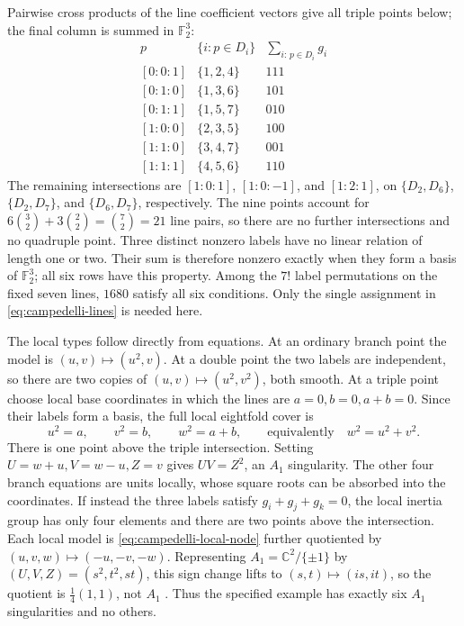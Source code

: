 \documentclass[a4paper,11pt]{article}
\numberwithin{equation}{section}
\theoremstyle{definition}
\begin{document}
Pairwise cross products of the line coefficient vectors give all triple points below; the final column is summed in $\mathbb F_2^3$:
\begin{equation}\label{eq:campedelli-incidences}
\begin{array}{c|c|c}
p&\{i:p\in D_i\}&\sum_{i:\,p\in D_i}g_i\\ \hline
{[0:0:1]}&\{1,2,4\}&111\\
{[0:1:0]}&\{1,3,6\}&101\\
{[0:1:1]}&\{1,5,7\}&010\\
{[1:0:0]}&\{2,3,5\}&100\\
{[1:1:0]}&\{3,4,7\}&001\\
{[1:1:1]}&\{4,5,6\}&110
\end{array}
\end{equation}
The remaining intersections are $[1:0:1]$, $[1:0:-1]$, and $[1:2:1]$,
on $\{D_2,D_6\}$, $\{D_2,D_7\}$, and $\{D_6,D_7\}$, respectively.
The nine points account for $6\binom32+3\binom22=\binom72=21$ line pairs, so there are no further intersections and no quadruple point.
Three distinct nonzero labels have no linear relation of length one or two.
Their sum is therefore nonzero exactly when they form a basis of $\mathbb F_2^3$; all six rows have this property.
Among the $7!$ label permutations on the fixed seven lines, $1680$ satisfy all six conditions.
Only the single assignment in \eqref{eq:campedelli-lines} is needed here.

The local types follow directly from equations. At an ordinary branch point the model is
$(u,v)\mapsto(u^2,v)$. At a double point the two labels are independent, so there are two copies of
$(u,v)\mapsto(u^2,v^2)$, both smooth.
At a triple point choose local base coordinates in which the lines are $a=0,b=0,a+b=0$.
Since their labels form a basis, the full local eightfold cover is
\begin{equation}\label{eq:campedelli-local-node}
u^2=a,\qquad v^2=b,\qquad w^2=a+b,
\qquad\text{equivalently}\quad w^2=u^2+v^2.
\end{equation}
There is one point above the triple intersection. Setting $U=w+u,V=w-u,Z=v$ gives $UV=Z^2$, an $A_1$ singularity.
The other four branch equations are units locally, whose square roots can be absorbed into the coordinates.
If instead the three labels satisfy $g_i+g_j+g_k=0$, the local inertia group has only four elements
and there are two points above the intersection. Each local model is \eqref{eq:campedelli-local-node}
further quotiented by $(u,v,w)\mapsto(-u,-v,-w)$.
Representing $A_1=\mathbb C^2/\{\pm1\}$ by $(U,V,Z)=(s^2,t^2,st)$,
this sign change lifts to $(s,t)\mapsto(is,it)$, so the quotient is $\frac14(1,1)$, not $A_1$
\cite[Table~1, cases~3.1, 3.3]{AlexeevPardiniCovers}.
Thus the specified example has exactly six $A_1$ singularities and no others.
\end{document}
